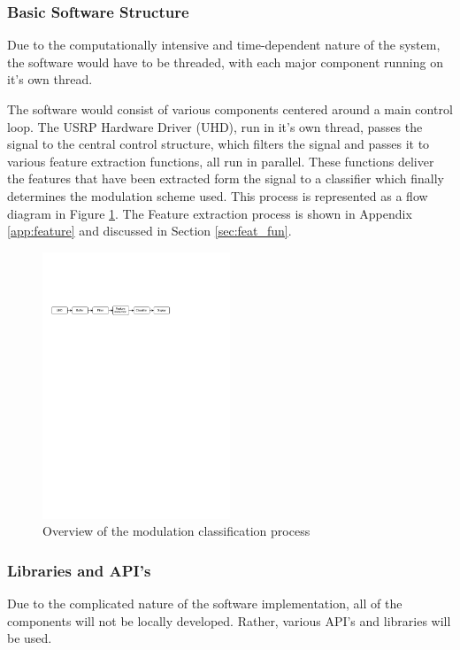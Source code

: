 \documentclass[10pt,twocolumn]{witseiepaper}
\begin{document}
		\subsubsection{Basic Software Structure}
			Due to the computationally intensive and time-dependent nature of the system, the software would have to be threaded, with each major component running on it's own thread.

			The software would consist of various components centered around a main control loop. The USRP Hardware Driver (UHD), run in it's own thread, passes the signal to the central control structure, which filters the signal and passes it to various feature extraction functions, all run in parallel. These functions deliver the features that have been extracted form the signal to a classifier which finally determines the modulation scheme used. This process is represented as a flow diagram in Figure \ref{fig:sw_overview}. The Feature extraction process is shown in Appendix \ref{app:feature} and discussed in Section \ref{sec:feat_fun}.

			\begin{figure}[h!]
				\centering
				\includegraphics[trim=1.2cm 31.5cm 9cm 8cm, clip=true,width=0.5\textwidth]{small.pdf}
				\caption{Overview of the modulation classification process}
				\label{fig:sw_overview}
			\end{figure}

		\subsubsection{Libraries and API's}
			Due to the complicated nature of the software implementation, all of the components will not be locally developed. Rather, various API's and libraries will be used.
\end{document}
